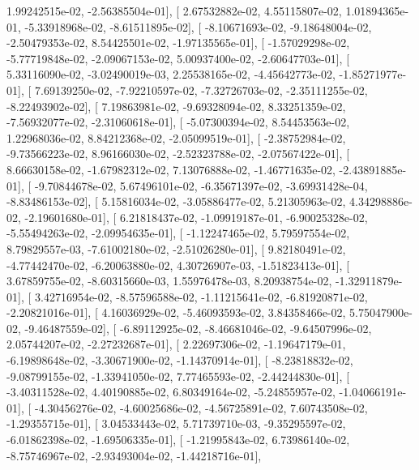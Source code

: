 \documentclass{article}
\begin{document}
          1.99242515e-02,  -2.56385504e-01],
       [  2.67532882e-02,   4.55115807e-02,   1.01894365e-01,
         -5.33918968e-02,  -8.61511895e-02],
       [ -8.10671693e-02,  -9.18648004e-02,  -2.50479353e-02,
          8.54425501e-02,  -1.97135565e-01],
       [ -1.57029298e-02,  -5.77719848e-02,  -2.09067153e-02,
          5.00937400e-02,  -2.60647703e-01],
       [  5.33116090e-02,  -3.02490019e-03,   2.25538165e-02,
         -4.45642773e-02,  -1.85271977e-01],
       [  7.69139250e-02,  -7.92210597e-02,  -7.32726703e-02,
         -2.35111255e-02,  -8.22493902e-02],
       [  7.19863981e-02,  -9.69328094e-02,   8.33251359e-02,
         -7.56932077e-02,  -2.31060618e-01],
       [ -5.07300394e-02,   8.54453563e-02,   1.22968036e-02,
          8.84212368e-02,  -2.05099519e-01],
       [ -2.38752984e-02,  -9.73566223e-02,   8.96166030e-02,
         -2.52323788e-02,  -2.07567422e-01],
       [  8.66630158e-02,  -1.67982312e-02,   7.13076888e-02,
         -1.46771635e-02,  -2.43891885e-01],
       [ -9.70844678e-02,   5.67496101e-02,  -6.35671397e-02,
         -3.69931428e-04,  -8.83486153e-02],
       [  5.15816034e-02,  -3.05886477e-02,   5.21305963e-02,
          4.34298886e-02,  -2.19601680e-01],
       [  6.21818437e-02,  -1.09919187e-01,  -6.90025328e-02,
         -5.55494263e-02,  -2.09954635e-01],
       [ -1.12247465e-02,   5.79597554e-02,   8.79829557e-03,
         -7.61002180e-02,  -2.51026280e-01],
       [  9.82180491e-02,  -4.77442470e-02,  -6.20063880e-02,
          4.30726907e-03,  -1.51823413e-01],
       [  3.67859755e-02,  -8.60315660e-03,   1.55976478e-03,
          8.20938754e-02,  -1.32911879e-01],
       [  3.42716954e-02,  -8.57596588e-02,  -1.11215641e-02,
         -6.81920871e-02,  -2.20821016e-01],
       [  4.16036929e-02,  -5.46093593e-02,   3.84358466e-02,
          5.75047900e-02,  -9.46487559e-02],
       [ -6.89112925e-02,  -8.46681046e-02,  -9.64507996e-02,
          2.05744207e-02,  -2.27232687e-01],
       [  2.22697306e-02,  -1.19647179e-01,  -6.19898648e-02,
         -3.30671900e-02,  -1.14370914e-01],
       [ -8.23818832e-02,  -9.08799155e-02,  -1.33941050e-02,
          7.77465593e-02,  -2.44244830e-01],
       [ -3.40311528e-02,   4.40190885e-02,   6.80349164e-02,
         -5.24855957e-02,  -1.04066191e-01],
       [ -4.30456276e-02,  -4.60025686e-02,  -4.56725891e-02,
          7.60743508e-02,  -1.29355715e-01],
       [  3.04533443e-02,   5.71739710e-03,  -9.35295597e-02,
         -6.01862398e-02,  -1.69506335e-01],
       [ -1.21995843e-02,   6.73986140e-02,  -8.75746967e-02,
         -2.93493004e-02,  -1.44218716e-01],
\end{document}
